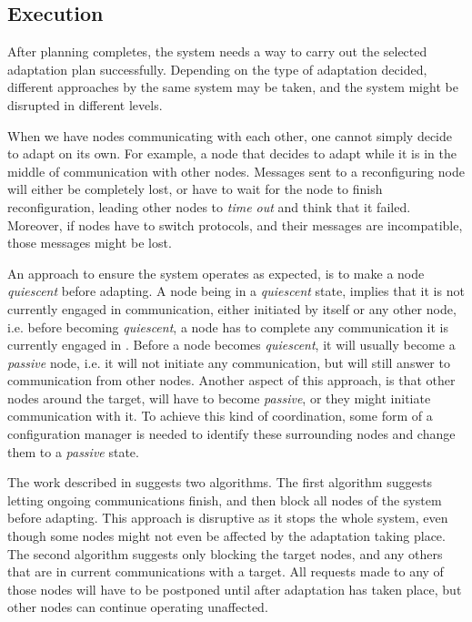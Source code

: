\subsection{Execution}
\label{ssec:execution}
\par After planning completes, the system needs a way to carry out the selected adaptation plan successfully. Depending on the type of adaptation decided, different approaches by the same system may be taken, and the system might be disrupted in different levels.
\par When we have nodes communicating with each other, one cannot simply decide to adapt on its own. For example, a node that decides to adapt while it is in the middle of communication with other nodes. Messages sent to a reconfiguring node will either be completely lost, or have to wait for the node to finish reconfiguration, leading other nodes to \textit{time out} and think that it failed. Moreover, if nodes have to switch protocols, and their messages are incompatible, those messages might be lost.%
\par An approach to ensure the system operates as expected, is to make a node \textit{quiescent} before adapting. A node being in a \textit{quiescent} state, implies that it is not currently engaged in communication, either initiated by itself or any other node, i.e. before becoming \textit{quiescent}, a node has to complete any communication it is currently engaged in \cite{Kramer1998}. Before a node becomes \textit{quiescent}, it will usually become a \textit{passive} node, i.e. it will not initiate any communication, but will still answer to communication from other nodes. Another aspect of this approach, is that other nodes around the target, will have to become \textit{passive}, or they might initiate communication with it. To achieve this kind of coordination, some form of a configuration manager is needed to identify these surrounding nodes and change them to a \textit{passive} state.
\par The work described in \cite{Goudarzi1996} suggests two algorithms. The first algorithm suggests letting ongoing communications finish, and then block all nodes of the system before adapting. This approach is disruptive as it stops the whole system, even though some nodes might not even be affected by the adaptation taking place. The second algorithm suggests only blocking the target nodes, and any others that are in current communications with a target. All requests made to any of those nodes will have to be postponed until after adaptation has taken place, but other nodes can continue operating unaffected.%
